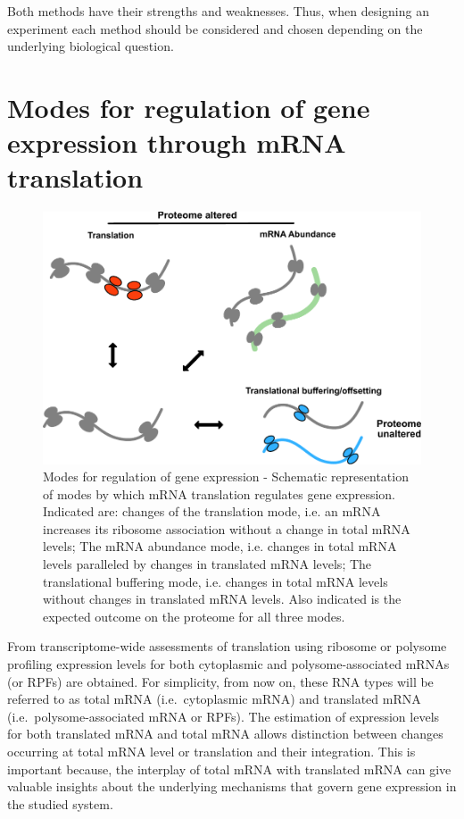 \documentclass[
  12pt,
  openany]{book}
\begin{document}
Both methods have their strengths and weaknesses. Thus, when designing an experiment each method should be considered and chosen depending on the underlying biological question.
\newline

\section{Modes for regulation of gene expression through mRNA translation} \label{modes}
\begin{figure}
  \includegraphics{./figures/geneModes_MRNA.pdf}
  \caption{Modes for regulation of gene expression - Schematic representation of modes by which mRNA translation regulates gene expression. Indicated are: changes of the translation mode, i.e. an mRNA increases its ribosome association without a change in total mRNA levels; The mRNA abundance mode, i.e. changes in total mRNA levels paralleled by changes in translated mRNA levels; The translational buffering mode, i.e. changes in total mRNA levels without changes in translated mRNA levels. Also indicated is the expected outcome on the proteome for all three modes. \label{fig:modes}}
\end{figure}

From transcriptome-wide assessments of translation using ribosome or polysome profiling expression levels for both cytoplasmic and polysome-associated mRNAs (or RPFs) are obtained. For simplicity, from now on, these RNA types will be referred to as total mRNA (i.e.~cytoplasmic mRNA) and translated mRNA (i.e.~polysome-associated mRNA or RPFs). The estimation of expression levels for both translated mRNA and total mRNA allows distinction between changes occurring at total mRNA level or translation and their integration. This is important because, the interplay of total mRNA with translated mRNA can give valuable insights about the underlying mechanisms that govern gene expression in the studied system.
\end{document}
